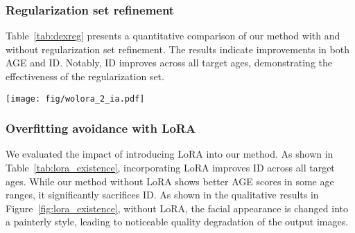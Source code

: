 \subsubsection{Regularization set refinement}
Table~\ref{tab:dexreg} presents a quantitative comparison of our method with and without regularization set refinement.
The results indicate improvements in both AGE and ID.
Notably, ID improves across all target ages, demonstrating the effectiveness of the regularization set.

\begin{table*}[t]
  \centering
  \caption{
  Quantitative comparison of our method with and without LoRA~\cite{hu2021lora}. 
  }
  \label{tab:lora_existence}
\end{table*}

\begin{figure*}[t]
  \centering
  \texttt{[image: fig/wolora\_2\_ia.pdf]}
  \caption{
    Qualitative comparison of our method with and without LoRA~\cite{hu2021lora}. 
  }
  \label{fig:lora_existence}
\end{figure*}

\subsubsection{
Overfitting avoidance with LoRA
}
We evaluated the impact of introducing LoRA into our method.
As shown in Table~\ref{tab:lora_existence}, incorporating LoRA improves ID across all target ages.
While our method without LoRA shows better AGE scores in some age ranges, it significantly sacrifices ID.
As shown in the qualitative results in Figure~\ref{fig:lora_existence}, without LoRA, the facial appearance is changed into a painterly style, leading to noticeable quality degradation of the output images.


